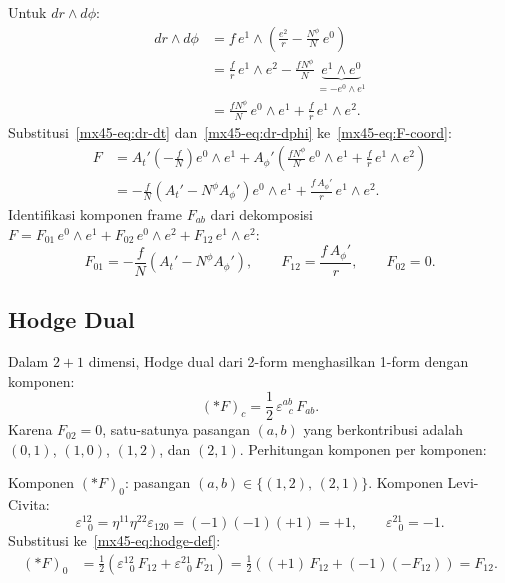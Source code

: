 \noindent Untuk $dr \wedge d\phi$:
\begin{align}
    dr \wedge d\phi &= f\,e^1 \wedge \left(\frac{e^2}{r} - \frac{N^\phi}{N}\,e^0\right) \nonumber\\[4pt]
    &= \frac{f}{r}\,e^1 \wedge e^2 - \frac{fN^\phi}{N}\,\underbrace{e^1 \wedge e^0}_{= -e^0 \wedge e^1} \nonumber\\[4pt]
    &= \frac{fN^\phi}{N}\,e^0 \wedge e^1 + \frac{f}{r}\,e^1 \wedge e^2. \label{mx45-eq:dr-dphi}
\end{align}
Substitusi~\eqref{mx45-eq:dr-dt} dan~\eqref{mx45-eq:dr-dphi} ke~\eqref{mx45-eq:F-coord}:
\begin{align}
    F &= A_t'\!\left(-\frac{f}{N}\right)e^0 \wedge e^1
    + A_\phi'\!\left(\frac{fN^\phi}{N}\,e^0 \wedge e^1 + \frac{f}{r}\,e^1 \wedge e^2\right) \nonumber\\[6pt]
    &= -\frac{f}{N}\!\left(A_t' - N^\phi A_\phi'\right)e^0 \wedge e^1
    + \frac{f\,A_\phi'}{r}\,e^1 \wedge e^2.
\end{align}
Identifikasi komponen frame $F_{ab}$ dari dekomposisi $F = F_{01}\,e^0 \wedge e^1 + F_{02}\,e^0 \wedge e^2 + F_{12}\,e^1 \wedge e^2$:
\begin{equation}
    F_{01} = -\frac{f}{N}\!\left(A_t' - N^\phi A_\phi'\right), \qquad
    F_{12} = \frac{f\,A_\phi'}{r}, \qquad
    F_{02} = 0. \label{mx45-eq:F-components}
\end{equation}

\subsection{Hodge Dual}

Dalam $2+1$ dimensi, Hodge dual dari 2-form menghasilkan 1-form dengan komponen:
\begin{equation}
    (*F)_c = \frac{1}{2}\,\varepsilon^{ab}_{\ \ \,c}\,F_{ab}. \label{mx45-eq:hodge-def}
\end{equation}
Karena $F_{02} = 0$, satu-satunya pasangan $(a,b)$ yang berkontribusi adalah $(0,1)$, $(1,0)$, $(1,2)$, dan $(2,1)$. Perhitungan komponen per komponen:

\noindent Komponen $(*F)_0$: pasangan $(a,b) \in \{(1,2),\,(2,1)\}$. Komponen Levi-Civita:
\begin{equation}
    \varepsilon^{12}_{\ \ \,0} = \eta^{11}\eta^{22}\varepsilon_{120}
    = (-1)(-1)(+1) = +1, \qquad
    \varepsilon^{21}_{\ \ \,0} = -1.
\end{equation}
Substitusi ke~\eqref{mx45-eq:hodge-def}:
\begin{align}
    (*F)_0 &= \frac{1}{2}\!\left(\varepsilon^{12}_{\ \ \,0}\,F_{12}
    + \varepsilon^{21}_{\ \ \,0}\,F_{21}\right)
    = \frac{1}{2}\!\left((+1)\,F_{12} + (-1)(-F_{12})\right)
    = F_{12}.
\end{align}

